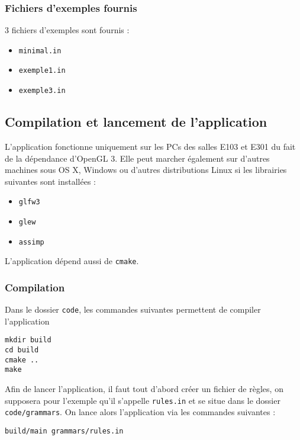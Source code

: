 \documentclass[a4paper,11pt]{article}
\begin{document}
\newpage
\subsubsection{Fichiers d'exemples fournis}

3 fichiers d'exemples sont fournis :
\begin{itemize}
    \item \texttt{minimal.in}
    \item \texttt{exemple1.in}
    \item \texttt{exemple3.in}
\end{itemize}

\subsection{Compilation et lancement de l'application}

L'application fonctionne uniquement sur les PCs des salles E103 et E301 du fait de la dépendance d'OpenGL 3. Elle peut marcher également sur d'autres machines sous OS X, Windows ou d'autres distributions Linux si les librairies suivantes sont installées :
\begin{itemize}
    \item \texttt{glfw3}
    \item \texttt{glew}
    \item \texttt{assimp}
\end{itemize}
L'application dépend aussi de \texttt{cmake}.

\subsubsection{Compilation}
Dans le dossier \texttt{code}, les commandes suivantes permettent de compiler l'application
\begin{verbatim}
mkdir build
cd build
cmake ..
make
\end{verbatim}

Afin de lancer l'application, il faut tout d'abord créer un fichier de règles, on supposera pour l'exemple qu'il s'appelle \texttt{rules.in} et se situe dans le dossier \texttt{code/grammars}.
On lance alors l'application via les commandes suivantes :
\begin{verbatim}
build/main grammars/rules.in
\end{verbatim}
\end{document}
